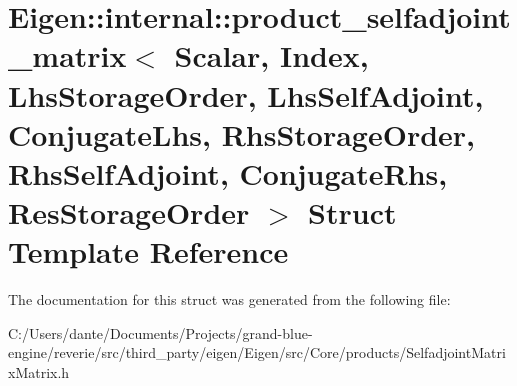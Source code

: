 \hypertarget{struct_eigen_1_1internal_1_1product__selfadjoint__matrix}{}\section{Eigen\+::internal\+::product\+\_\+selfadjoint\+\_\+matrix$<$ Scalar, Index, Lhs\+Storage\+Order, Lhs\+Self\+Adjoint, Conjugate\+Lhs, Rhs\+Storage\+Order, Rhs\+Self\+Adjoint, Conjugate\+Rhs, Res\+Storage\+Order $>$ Struct Template Reference}
\label{struct_eigen_1_1internal_1_1product__selfadjoint__matrix}


The documentation for this struct was generated from the following file\+:\begin{DoxyCompactItemize}
\item 
C\+:/\+Users/dante/\+Documents/\+Projects/grand-\/blue-\/engine/reverie/src/third\+\_\+party/eigen/\+Eigen/src/\+Core/products/Selfadjoint\+Matrix\+Matrix.\+h\end{DoxyCompactItemize}
